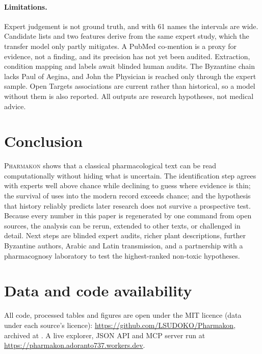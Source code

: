\documentclass[11pt,a4paper]{article}
\newcommand{\pkm}{\textsc{Pharmakon}}
\begin{document}
\paragraph{Limitations.} Expert judgement is not ground truth, and with 61 names the intervals are wide. Candidate lists and two features derive from the same expert study, which the transfer model only partly mitigates. A PubMed co-mention is a proxy for evidence, not a finding, and its precision has not yet been audited. Extraction, condition mapping and labels await blinded human audits. The Byzantine chain lacks Paul of Aegina, and John the Physician is reached only through the expert sample. Open Targets associations are current rather than historical, so a model without them is also reported. All outputs are research hypotheses, not medical advice.

\section{Conclusion}

\pkm{} shows that a classical pharmacological text can be read computationally without hiding what is uncertain. The identification step agrees with experts well above chance while declining to guess where evidence is thin; the survival of uses into the modern record exceeds chance; and the hypothesis that history reliably predicts later research does not survive a prospective test. Because every number in this paper is regenerated by one command from open sources, the analysis can be rerun, extended to other texts, or challenged in detail. Next steps are blinded expert audits, richer plant descriptions, further Byzantine authors, Arabic and Latin transmission, and a partnership with a pharmacognosy laboratory to test the highest-ranked non-toxic hypotheses.

\section*{Data and code availability}
\small
All code, processed tables and figures are open under the MIT licence (data under each source’s licence): \url{https://github.com/LSUDOKO/Pharmakon}, archived at  \citep{arpit2026pharmakon}. A live explorer, JSON API and MCP server run at \url{https://pharmakon.adoranto737.workers.dev}.
\end{document}
